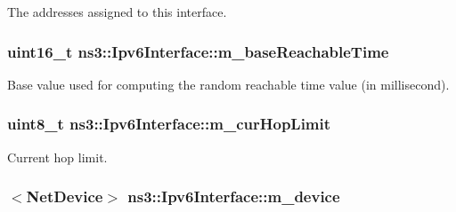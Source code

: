 The addresses assigned to this interface. 

\subsubsection[{\texorpdfstring{m\+\_\+base\+Reachable\+Time}{m_baseReachableTime}}]{\setlength{\rightskip}{0pt plus 5cm}uint16\+\_\+t ns3\+::\+Ipv6\+Interface\+::m\+\_\+base\+Reachable\+Time\hspace{0.3cm}{\ttfamily [private]}}\hypertarget{classns3_1_1Ipv6Interface_ac417157a959058a8a3956bc1b0535701}{}\label{classns3_1_1Ipv6Interface_ac417157a959058a8a3956bc1b0535701}


Base value used for computing the random reachable time value (in millisecond). 

\subsubsection[{\texorpdfstring{m\+\_\+cur\+Hop\+Limit}{m_curHopLimit}}]{\setlength{\rightskip}{0pt plus 5cm}uint8\+\_\+t ns3\+::\+Ipv6\+Interface\+::m\+\_\+cur\+Hop\+Limit\hspace{0.3cm}{\ttfamily [private]}}\hypertarget{classns3_1_1Ipv6Interface_a0b4e9c7395917c20bc89c21c577fa723}{}\label{classns3_1_1Ipv6Interface_a0b4e9c7395917c20bc89c21c577fa723}


Current hop limit. 

\subsubsection[{\texorpdfstring{m\+\_\+device}{m_device}}]{$<${\bf Net\+Device}$>$ ns3\+::\+Ipv6\+Interface\+::m\+\_\+device\hspace{0.3cm}{\ttfamily [private]}}\hypertarget{classns3_1_1Ipv6Interface_a1330429d5db7b31fc0d5fe16609d8c61}{}\label{classns3_1_1Ipv6Interface_a1330429d5db7b31fc0d5fe16609d8c61}


